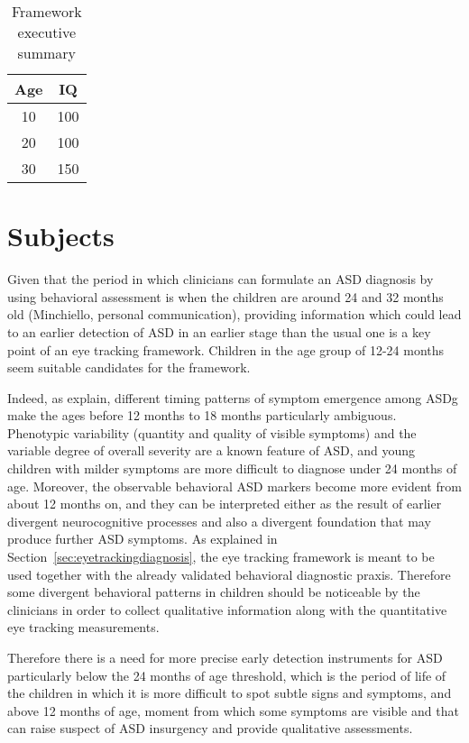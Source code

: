 \begin{table}[tbp]
  \centering
  \begin{tabular}{c|c}
    Age  & IQ  \\ 
    \hline
    10   & 100 \\
    20   & 100 \\
    30   & 150
  \end{tabular}
  \caption{Framework executive summary}
  \label{tab:frameworksummary}
\end{table}


\section{Subjects}
\label{sec:fwksubjects}

Given that the period in which clinicians can formulate an ASD diagnosis by using behavioral assessment is when the children are around 24 and 32 months old (Minchiello, personal communication), providing information which could lead to an earlier detection of ASD in an earlier stage than the usual one is a key point of an eye tracking framework. Children in the age group of 12-24 months seem suitable candidates for the framework.

Indeed, as \cite{towie2016screening} explain, different timing patterns of symptom emergence among ASDg make the ages before 12 months to 18 months particularly ambiguous. Phenotypic variability (quantity and quality of visible symptoms) and the variable degree of overall severity are a known feature of ASD, and young children with milder symptoms are more difficult to diagnose under 24 months of age. Moreover, the observable behavioral ASD markers become more evident from about 12 months on, and they can be interpreted either as the result of earlier divergent neurocognitive processes and also a divergent foundation that may produce further ASD symptoms. As explained in Section~\ref{sec:eyetrackingdiagnosis}, the eye tracking framework is meant to be used together with the already validated behavioral diagnostic praxis. Therefore some divergent behavioral patterns in children should be noticeable by the clinicians in order to collect qualitative information along with the quantitative eye tracking measurements.

Therefore there is a need for more precise early detection instruments for ASD particularly below the 24 months of age threshold, which is the period of life of the children in which it is more difficult to spot subtle signs and symptoms, and above 12 months of age, moment from which some symptoms are visible and that can raise suspect of ASD insurgency and provide qualitative assessments.

